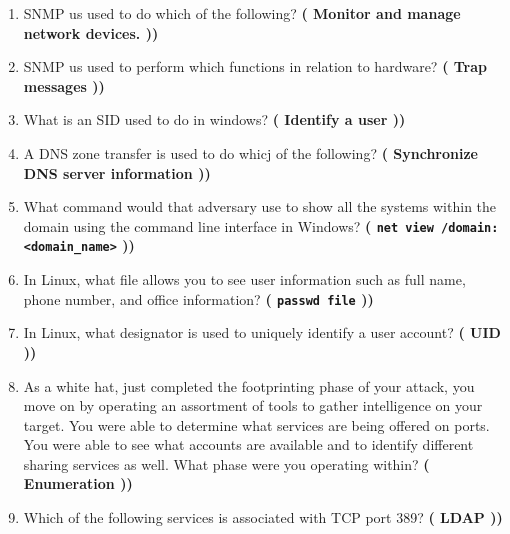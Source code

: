 \begin{enumerate}
    \item SNMP us used to do which of the following? \textbf{\left( Monitor and manage network devices. \right))}
    \item SNMP us used to perform which functions in relation to hardware? \textbf{\left( Trap messages \right))}
    \item What is an SID used to do in windows? \textbf{\left( Identify a user \right))}
    \item A DNS zone transfer is used to do whicj of the following? \textbf{\left( Synchronize DNS server information \right))}
    \item What command would that adversary use to show all the systems within the domain using the command line interface in Windows? \textbf{\left( \verb|net view /domain:<domain_name>| \right))}
    \item In Linux, what file allows you to see user information such as full name, phone number, and office information? \textbf{\left( \verb|passwd file| \right))}
    \item In Linux, what designator is used to uniquely identify a user account? \textbf{\left( UID \right))}
    \item As a white hat, just completed the footprinting phase of your attack, you move on by operating an assortment of tools to gather intelligence on your target. You were able to determine what services are being offered on ports. You were able to see what accounts are available and to identify different sharing services as well. What phase were you operating within? \textbf{\left( Enumeration \right))}
    \item Which of the following services is associated with TCP port 389? \textbf{\left( LDAP \right))}
\end{enumerate}

